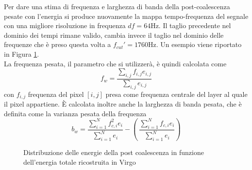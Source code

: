 Per dare una stima di frequenza e larghezza di banda della post-coalescenza pesate con l'energia si produce nuovamente la mappa tempo-frequenza del segnale con una migliore risoluzione in frequenza $df=64$Hz. Il taglio precedente nel dominio dei tempi rimane valido, cambia invece il taglio nel dominio delle frequenze che è preso questa volta a $f_{cut}' = 1760$Hz. Un esempio viene riportato in Figura \ref{fig:time_freq_pm}.\\
La frequenza pesata, il parametro che si utilizzerà, è quindi calcolata come 
\begin{equation}
f_w=\frac{\sum_{i,j}f_{i,j}e_{i,j}}{\sum_{i,j}e_{i,j}}
\end{equation}
con $f_{i,j}$ frequenza del pixel $[i,j]$ presa come frequenza centrale del layer al quale il pixel appartiene. È calcolata inoltre anche la larghezza di banda pesata, che è definita come la varianza pesata  della frequenza
\begin{equation}
b_w =\frac{\sum_{i=1}^Nf_{c,i}^2e_i}{\sum_{i=1}^Ne_i} - \left(\ \frac{\sum_{i=1}^Nf_{c,i}e_i}{\sum_{i=1}^Ne_i}\right)
\end{equation}
\begin{figure}[ht]
	\vspace{-20pt}
	\centering
	\quad\quad
	\vspace{-8pt}
	\caption{Distribuzione delle energie della post coalescenza in funzione dell'energia totale ricostruita in Virgo}
	\label{fig:time_freq_pm}
	\vspace{-8pt}
\end{figure}

